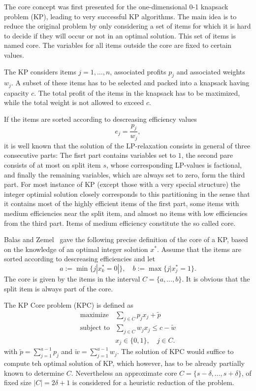 The core concept was first presented for the one-dimensional 0-1 knapsack problem (KP),
leading to very successful KP algorithms.
The main idea is to reduce the original problem by only considering a set of
items for which it is hard to decide if they will occur or not in an optimal solution.
This set of items is named core.
The variables for all items outside the core are fixed to certain values.

The KP considers items $j = 1, \ldots, n$, associated profits $p_j$ and
associated weights $w_j$.
A subset of these items has to be selected and packed into a knapsack having capacity $c$.
The total profit of the items in the knapsack has to be maximized, while the
total weight is not allowed to exceed $c$.

If the items are sorted according to descreasing efficiency values
\begin{displaymath}
  e_j = \frac{p_j}{w_j},
\end{displaymath}
it is well known that the solution of the LP-relaxation consists in general of
three consecutive parts: The fisrt part contains variables set to $1$, the second
pare consists of at most on split item $s$, whose corresponding LP-values is
factional, and finally the remaining variables, which are always set to zero,
form the third part.
For most instance of KP (except those with a very special structure) the integer
optimial solution closely corresponds to this partitioning in the sense that it
contains most of the highly efficient items of the first part, some items with
medium efficiencies near the split item, and almost no items with low efficiencies
from the third part.
Items of medium efficiency constitute the so called core.

Balas and Zemel~\cite{balas1980algorithm} gave the following precise definition
of the core of a KP, based on the knowledge of an optimal integer solution $x^*$.
Assume that the items are sorted according to descreasing efficiencies and let
\begin{displaymath}
  a := \min\{ j | x_k^* = 0 |\}, \quad b := \max\{ j | x_j^* = 1 \}.
\end{displaymath}
The core is given by the items in the interval $C = \{a, \ldots, b\}$.
It is obvious that the split item is always part of the core.

The KP Core problem (KPC) is defined as
\begin{align*}
  \text{maximize} & \sum_{j \in C} p_j x_j  + \tilde{p}\\
  \text{subject to} & \sum_{j \in C} w_{j} x_j \leqslant c - \tilde{w}\\
  & x_j \in \{0, 1\}, \quad j \in C.
\end{align*}
with $\tilde{p} = \sum^{a-1}_{j=1} p_j$  and $\tilde{w} = \sum^{a-1}_{j=1} w_j$.
The solution of KPC would suffice to compute teh optimal solution of KP, which
however, has to be already partially known to determine $C$.
Nevertheless an approximate core $C = \{s-\delta, \ldots, s+\delta\}$,
of fixed size $|C| = 2\delta+1$ is considered for a heuristic reduction of the problem.

